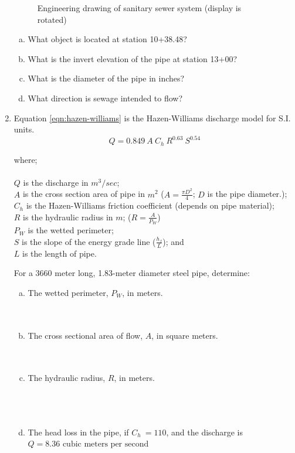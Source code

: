 \documentclass[11pt]{article}
\newcommand\tab[1][1cm]{\hspace*{#1}}
\begin{document}
\begin{enumerate}
\begin{figure}[h!]
   \caption{Engineering drawing of sanitary sewer system (display is rotated)}
   \label{fig:SewerDrawing}
\end{figure}

\begin{enumerate}[(a)]
\item What object is located at station 10+38.48?
\item What is the invert elevation of the pipe at station 13+00?
\item What is the diameter of the pipe in inches?
\item What direction is sewage intended to flow?
\end{enumerate}
\clearpage
\item Equation \ref{eqn:hazen-williams} is the  Hazen-Williams discharge model for S.I. units.
\begin{equation}
Q = 0.849~A~C_h~R^{0.63}~S^{0.54}
\label{eqn:hazen-williams}
\end{equation}

where;\\~\\
\tab $Q$ is the discharge in $m^3/sec$;\\
\tab $A$ is the cross section area of pipe in $m^2$ ($A = \frac{\pi D^2}{4}$; $D$ is the pipe diameter.);\\
\tab $C_h$ is the Hazen-Williams friction coefficient (depends on pipe material);\\
\tab $R $ is the hydraulic radius in $m$;  ($R=\frac{A}{P_W}$)\\
\tab $P_W$ is the wetted perimeter; \\
\tab $S$ is the slope of the energy grade line ($\frac{h_f}{L}$); and \\
\tab $L$ is the length of pipe.

For a 3660 meter long, 1.83-meter diameter steel pipe, determine:
\begin{enumerate}[(a)]
\item The wetted perimeter, $P_W$, in meters. \\~\\~\\
\item The cross sectional area of flow, $A$, in square meters. \\~\\~\\
\item The hydraulic radius, $R$, in meters. \\~\\~\\~\\
\item The head loss in the pipe, if $C_h~=110$, and the discharge is $Q=8.36\text{~cubic meters per second}$


\end{enumerate}
\end{enumerate}
\end{document}

